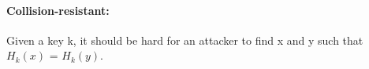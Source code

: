 \paragraph{Collision-resistant:} Given a key k, it should be hard for an
attacker to find x and y such that $H_k(x)$ = $H_k(y)$.  \\ 

